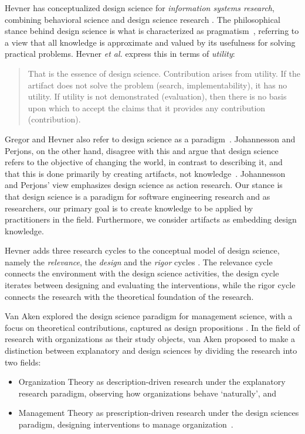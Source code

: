 \documentclass[graybox]{svmult}
\begin{document}
Hevner has conceptualized design science for \emph{information systems research}, combining behavioral science and design science research \cite{hevner_design_2004,hevner_design_2010}.
The philosophical stance behind design science is what is characterized as pragmatism~\cite{easterbrook_selecting_2008}, referring to a view that all knowledge is approximate and valued by its usefulness for solving practical problems. Hevner \emph{et al.} express this in terms of \emph{utility}: 

\begin{quote}
	That is the essence of design science. Contribution arises from utility. If the artifact does not solve the problem (search, implementability), it has no utility. If utility is not demonstrated (evaluation), then there is no basis upon which to accept the claims that it provides any contribution (contribution).~\cite[p. 91]{hevner_design_2004}
\end{quote}


Gregor and Hevner also refer to design science as a paradigm~\cite{gregor_positioning_2013}. Johannesson and Perjons, on the other hand, disagree with this and argue that design science refers to the objective of changing the world, in contrast to describing it, and that this is done primarily by creating artifacts, not knowledge~\cite{johannesson_introduction_2014}. Johannesson and Perjons' view emphasizes design science as action research. Our stance is that design science is a paradigm for software engineering research and as researchers, our primary goal is to create knowledge to be applied by practitioners in the field. Furthermore, we consider artifacts as embedding design knowledge. 

Hevner adds three research cycles to the conceptual model of design science, namely the \emph{relevance}, the \emph{design} and the \emph{rigor} cycles \cite{Hevner2007}. The relevance cycle connects the environment with the design science activities, the design  cycle iterates between designing and evaluating the interventions, while the rigor cycle connects the research with the theoretical foundation of the research.



Van Aken explored the design science paradigm for management science, with a focus on theoretical contributions, captured as design propositions \cite{van_aken_management_2004,van_aken_management_2005}. 
In the field of research with organizations as their study objects, van Aken proposed to make a distinction between explanatory and design sciences by dividing the research into two fields: 
\begin{itemize}
\item Organization Theory as description-driven research under the explanatory research paradigm, observing how organizations behave `naturally', and 
\item Management Theory as prescription-driven research under the design sciences paradigm, designing interventions to manage organization~\cite{van_aken_management_2004}.  
\end{itemize}
\end{document}
